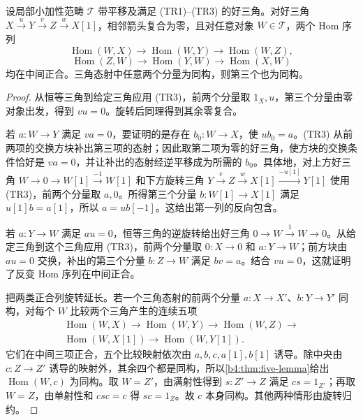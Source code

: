 \begin{lemma}\label{b4:lem:pretriangle-hom}
	设局部小加性范畴 \(\mathcal T\) 带平移及满足 (TR1)--(TR3) 的好三角。对好三角 \(X\xrightarrow{u}Y\xrightarrow{v}Z\xrightarrow{w}X[1]\)，相邻箭头复合为零，且对任意对象 \(W\in\mathcal T\)，两个 Hom 序列
	\[
		\operatorname{Hom}(W,X)\longrightarrow\operatorname{Hom}(W,Y) \longrightarrow\operatorname{Hom}(W,Z),
	\]
	\[
		\operatorname{Hom}(Z,W)\longrightarrow\operatorname{Hom}(Y,W) \longrightarrow\operatorname{Hom}(X,W)
	\]
	均在中间正合。三角态射中任意两个分量为同构，则第三个也为同构。
\end{lemma}
\begin{proof}
	从恒等三角到给定三角应用 (TR3)，前两个分量取 \(1_X,u\)，第三个分量由零对象出发，得到 \(vu=0\)。旋转后同理得到其余零复合。

	若 \(a:W\to Y\) 满足 \(va=0\)，要证明的是存在 \(b_0:W\to X\)，使 \(ub_0=a\)。(TR3) 从前两项的交换方块补出第三项的态射；因此取第二项为零的好三角，使方块的交换条件恰好是 \(va=0\)，并让补出的态射经逆平移成为所需的 \(b_0\)。具体地，对上方好三角 \(W\to0\to W[1]\xrightarrow{-1}W[1]\) 和下方旋转三角 \(Y\xrightarrow{v}Z\xrightarrow{w}X[1]\xrightarrow{-u[1]}Y[1]\) 使用 (TR3)，前两个分量取 \(a,0\)。所得第三个分量 \(b:W[1]\to X[1]\) 满足 \(u[1]b=a[1]\)，所以 \(a=ub[-1]\)。这给出第一列的反向包含。

	若 \(a:Y\to W\) 满足 \(au=0\)，恒等三角的逆旋转给出好三角 \(0\to W\xrightarrow{1}W\to0\)。从给定三角到这个三角应用 (TR3)，前两个分量取 \(0:X\to0\) 和 \(a:Y\to W\)；前方块由 \(au=0\) 交换，补出的第三个分量 \(b:Z\to W\) 满足 \(bv=a\)。结合 \(vu=0\)，这就证明了反变 Hom 序列在中间正合。

	把两类正合列旋转延长。若一个三角态射的前两个分量 \(a:X\to X'\)、\(b:Y\to Y'\) 同构，对每个 \(W\) 比较两个三角产生的连续五项
	\[
		\begin{gathered}
			\operatorname{Hom}(W,X)\longrightarrow\operatorname{Hom}(W,Y) \longrightarrow\operatorname{Hom}(W,Z)\longrightarrow{}\\
			\operatorname{Hom}(W,X[1])\longrightarrow\operatorname{Hom}(W,Y[1]).
		\end{gathered}
	\]
	它们在中间三项正合，五个比较映射依次由 \(a,b,c,a[1],b[1]\) 诱导。除中央由 \(c:Z\to Z'\) 诱导的映射外，其余四个都是同构，所以\cref{b4:thm:five-lemma}给出 \(\operatorname{Hom}(W,c)\) 为同构。取 \(W=Z'\)，由满射性得到 \(s:Z'\to Z\) 满足 \(cs=1_{Z'}\)；再取 \(W=Z\)，由单射性和 \(csc=c\) 得 \(sc=1_Z\)。故 \(c\) 本身同构。其他两种情形由旋转归约。
\end{proof}

